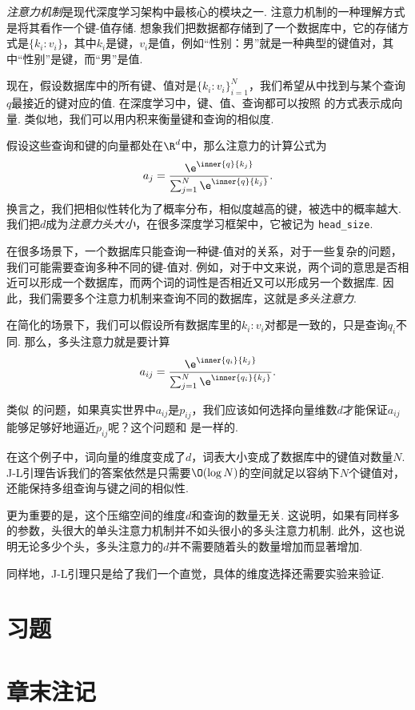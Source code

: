 \begin{example}[多头注意力]
\emph{注意力机制}是现代深度学习架构中最核心的模块之一. 注意力机制的一种理解方式是将其看作一个键-值存储. 想象我们把数据都存储到了一个数据库中，它的存储方式是$\{k_i:v_i\}$，其中$k_i$是键，$v_i$是值，例如“性别：男”就是一种典型的键值对，其中“性别”是键，而“男”是值. 

现在，假设数据库中的所有键、值对是$\{k_i:v_i\}_{i=1}^N$，我们希望从中找到与某个查询$q$最接近的键对应的值. 在深度学习中，键、值、查询都可以按照 的方式表示成向量. 类似地，我们可以用内积来衡量键和查询的相似度. 

假设这些查询和键的向量都处在$\R^d$中，那么注意力的计算公式为
\[
    a_j = \frac{\e^{\inner{q}{k_j}}}{\sum_{j=1}^N \e^{\inner{q}{k_j}}}.
\]
换言之，我们把相似性转化为了概率分布，相似度越高的键，被选中的概率越大. 我们把$d$成为\emph{注意力头大小}，在很多深度学习框架中，它被记为 \verb#head_size#.

在很多场景下，一个数据库只能查询一种键-值对的关系，对于一些复杂的问题，我们可能需要查询多种不同的键-值对. 例如，对于中文来说，两个词的意思是否相近可以形成一个数据库，而两个词的词性是否相近又可以形成另一个数据库. 因此，我们需要多个注意力机制来查询不同的数据库，这就是\emph{多头注意力}.

在简化的场景下，我们可以假设所有数据库里的$k_i:v_i$对都是一致的，只是查询$q_i$不同. 那么，多头注意力就是要计算
\[
    a_{ij} = \frac{\e^{\inner{q_i}{k_j}}}{\sum_{j=1}^N \e^{\inner{q_i}{k_j}}}.
\]

类似 的问题，如果真实世界中$a_{ij}$是$p_{ij}$，我们应该如何选择向量维数$d$才能保证$a_{ij}$能够足够好地逼近$p_{ij}$呢？这个问题和 是一样的.

在这个例子中，词向量的维度变成了$d$，词表大小变成了数据库中的键值对数量$N$. J-L引理告诉我们的答案依然是只需要$\O(\log N)$的空间就足以容纳下$N$个键值对，还能保持多组查询与键之间的相似性. 

更为重要的是，这个压缩空间的维度$d$和查询的数量无关. 这说明，如果有同样多的参数，头很大的单头注意力机制并不如头很小的多头注意力机制. 此外，这也说明无论多少个头，多头注意力的$d$并不需要随着头的数量增加而显著增加.

同样地，J-L引理只是给了我们一个直觉，具体的维度选择还需要实验来验证.
\end{example}


\section{习题}


\section{章末注记}

